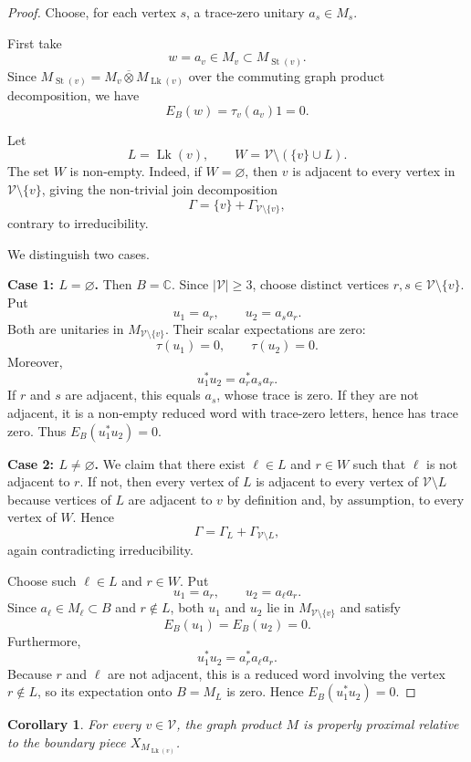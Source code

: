 \documentclass[11pt]{amsart}
\newtheorem{corollary}[theorem]{Corollary}
\theoremstyle{definition}
\newcommand{\V}{\mathcal V}
\newcommand{\Lk}{\operatorname{Lk}}
\newcommand{\St}{\operatorname{St}}
\newcommand{\C}{\mathbb C}
\newcommand{\bbarotimes}{\mathbin{\overline\otimes}}
\begin{document}
\begin{proof}
Choose, for each vertex $s$, a trace-zero unitary $a_s\in M_s$.

First take
\[
w=a_v\in M_v\subset M_{\St(v)}.
\]
Since $M_{\St(v)}=M_v\bbarotimes M_{\Lk(v)}$ over the commuting graph product decomposition, we have
\[
E_B(w)=\tau_v(a_v)1=0.
\]

Let
\[
L=\Lk(v),\qquad W=\V\setminus(\{v\}\cup L).
\]
The set $W$ is non-empty.  Indeed, if $W=\varnothing$, then $v$ is adjacent to every vertex in $\V\setminus\{v\}$, giving the non-trivial join decomposition
\[
\Gamma=\{v\}+\Gamma_{\V\setminus\{v\}},
\]
contrary to irreducibility.

We distinguish two cases.

\smallskip

\noindent\textbf{Case 1: $L=\varnothing$.}
Then $B=\C$.  Since $|\V|\geq 3$, choose distinct vertices $r,s\in \V\setminus\{v\}$.  Put
\[
u_1=a_r,\qquad u_2=a_s a_r.
\]
Both are unitaries in $M_{\V\setminus\{v\}}$.  Their scalar expectations are zero:
\[
\tau(u_1)=0,\qquad \tau(u_2)=0.
\]
Moreover,
\[
u_1^*u_2=a_r^*a_s a_r.
\]
If $r$ and $s$ are adjacent, this equals $a_s$, whose trace is zero.  If they are not adjacent, it is a non-empty reduced word with trace-zero letters, hence has trace zero.  Thus $E_B(u_1^*u_2)=0$.

\smallskip

\noindent\textbf{Case 2: $L\neq \varnothing$.}
We claim that there exist $\ell\in L$ and $r\in W$ such that $\ell$ is not adjacent to $r$.  If not, then every vertex of $L$ is adjacent to every vertex of $\V\setminus L$ because vertices of $L$ are adjacent to $v$ by definition and, by assumption, to every vertex of $W$.  Hence
\[
\Gamma=\Gamma_L+\Gamma_{\V\setminus L},
\]
again contradicting irreducibility.

Choose such $\ell\in L$ and $r\in W$.  Put
\[
u_1=a_r,\qquad u_2=a_\ell a_r.
\]
Since $a_\ell\in M_\ell\subset B$ and $r\notin L$, both $u_1$ and $u_2$ lie in $M_{\V\setminus\{v\}}$ and satisfy
\[
E_B(u_1)=E_B(u_2)=0.
\]
Furthermore,
\[
u_1^*u_2=a_r^*a_\ell a_r.
\]
Because $r$ and $\ell$ are not adjacent, this is a reduced word involving the vertex $r\notin L$, so its expectation onto $B=M_L$ is zero.  Hence $E_B(u_1^*u_2)=0$.
\end{proof}

\begin{corollary}\label{cor:relative}
For every $v\in\V$, the graph product $M$ is properly proximal relative to the boundary piece $X_{M_{\Lk(v)}}$.
\end{corollary}
\end{document}
